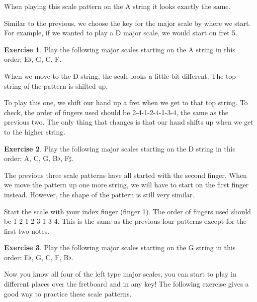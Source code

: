 \documentclass[12pt]{article}
\theoremstyle{definition}
\newtheorem{exercise}{Exercise}
\begin{document}
When playing this scale pattern on the A string it looks exactly the same. 


Similar to the previous, we choose the key for the major scale by where we start. For example, if we wanted to play a D major scale, we would start on fret 5. 

\begin{exercise}
Play the following major scales starting on the A string in this order: E$\flat$, G, C, F.
\end{exercise}

When we move to the D string, the scale looks a little bit different. The top string of the pattern is shifted up. 


To play this one, we shift our hand up a fret when we get to that top string. To check, the order of fingers used should be 2-4-1-2-4-1-3-4, the same as the previous two. The only thing that changes is that our hand shifts up when we get to the higher string. 

\begin{exercise}
Play the following major scales starting on the D string in this order: A, C, G, B$\flat$, F$\sharp$.
\end{exercise}

The previous three scale patterns have all started with the second finger. When we move the pattern up one more string, we will have to start on the first finger instead. However, the shape of the pattern is still very similar. 


Start the scale with your index finger (finger 1). The order of fingers used should be 1-2-1-2-3-1-3-4. This is the same as the previous four patterns except for the first two notes. 

\begin{exercise}
Play the following major scales starting on the G string in this order: E$\flat$, G, C, F, B$\flat$.
\end{exercise}

Now you know all four of the left type major scales, you can start to play in different places over the fretboard and in any key! The following exercise gives a good way to practice these scale patterns. 
\end{document}
